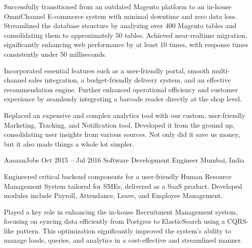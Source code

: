 \documentclass[12pt]{article}
\begin{document}
{{\begin{newitemize}
		\item {Successfully transitioned from an outdated Magento platform to an in-house OmniChannel E-commerce system with minimal downtime and zero data loss. Streamlined the database structure by analyzing over 400 Magento tables and consolidating them to approximately 50 tables. Achieved near-realtime migration, significantly enhancing web performance by at least 10 times, with response times consistently under 50 milliseconds.}
		\item {Incorporated essential features such as a user-friendly portal, smooth multi-channel sales integration, a budget-friendly delivery system, and an effective recommendation engine. Further enhanced operational efficiency and customer experience by seamlessly integrating a barcode reader directly at the shop level.}
		\item {Replaced an expensive and complex analytics tool with our custom, user-friendly Marketing, Tracking, and Notification tool. Developed it from the ground up, consolidating user insights from various sources. Not only did it save us money, but it also made things a whole lot simpler.}
		\end{newitemize}}

	\job
	{AasaanJobs}
	{Oct 2015 – Jul 2016}
	{Software Development Engineer}
	{Mumbai, India}
	{\begin{newitemize}

		\item {Engineered critical backend components for a user-friendly Human Resource Management System tailored for SMEs, delivered as a SaaS product. Developed modules include Payroll, Attendance, Leave, and Employee Management.}
		\item {Played a key role in enhancing the in-house Recruitment Management system, focusing on syncing data efficiently from Postgres to ElasticSearch using a CQRS-like pattern. This optimization significantly improved the system's ability to manage loads, queries, and analytics in a cost-effective and streamlined manner.}
		\end{newitemize}}
}

\end{document}
